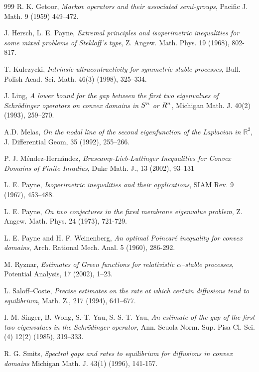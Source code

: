 \documentclass[11pt,leqno]{article}
\theoremstyle{definition}
\newcommand{\R}{\mathbb{R}}
\numberwithin{equation}{section}
\begin{document}
\begin{thebibliography}{999}
 R{.} K{.}
Getoor,
\emph{Markov operators and their associated
semi-groups},
Pacific J{.} Math{.} 9 (1959)
449--472.

 J. Hersch, L. E. Payne, \emph{Extremal principles and isoperimetric inequalities for some mixed problems of Stekloff's type}, 
 Z. Angew. Math. Phys. 19 (1968), 802-817.


T{.} Kulczycki,
\emph{Intrinsic
ultracontractivity for symmetric stable processes},
Bull{.} Polish
Acad{.} Sci{.} Math{.} 46(3) (1998),
325--334.


J{.} Ling, \emph{A lower bound for the gap between the first two eigenvalues of
Schr{\"o}dinger operators on convex domains in $S\sp n$ or $R\sp n$},
Michigan Math{.} J{.} 40(2) (1993), 259--270.

 A{.}D{.} Melas, \emph{On the nodal line of the second
eigenfunction of the Laplacian in $\R^{2}$, } J{.} Differential Geom, 
35 (1992),
255--266.

P{.} J{.}
M\'endez-Hern\'andez,
\emph{Brascamp-Lieb-Luttinger  Inequalities for
Convex Domains
of Finite Inradius}, Duke Math.
J., 13 (2002),  93--131

L{.} E{.} Payne,
\emph{Isoperimetric inequalities
and their applications},
SIAM Rev. 9 (1967),
453--488.

L. E. Payne, 
\emph{On two conjectures in the fixed membrane eigenvalue problem},
Z. Angew. Math. Phys. 24 (1973), 721-729.


L. E. Payne and H. F. Weinenberg,
\emph{An optimal Poincar\'e inequality for convex domains},
Arch. Rational Mech. Anal. 5 (1960), 286-292. 

 M{.} Ryznar, \emph{Estimates of Green functions for relativistic
$\alpha$--stable processes}, Potential Analysis, 17 (2002), 1--23.

 L{.} Saloff--Coste, \emph{Precise estimates on the
 rate at which certain diffusions tend to
equilibrium}, Math. Z., 217 (1994), 641--677. 



I{.} M{.} Singer, B{.} Wong,
S{.}-T{.}
Yau, S{.} S{.}-T{.} Yau,
\emph{An estimate of the gap of
the first
two eigenvalues in
the Schr{\"o}dinger operator},
Ann{.}
Scuola
Norm{.} Sup{.} Pisa Cl{.} Sci{.} (4) 12(2) (1985),  319--333.

 R. G. Smits,  
\emph{Spectral gaps and rates to equilibrium for diffusions in convex
  domains}  Michigan Math. J. 43(1) (1996), 141-157. 


\end{thebibliography}
\end{document}
